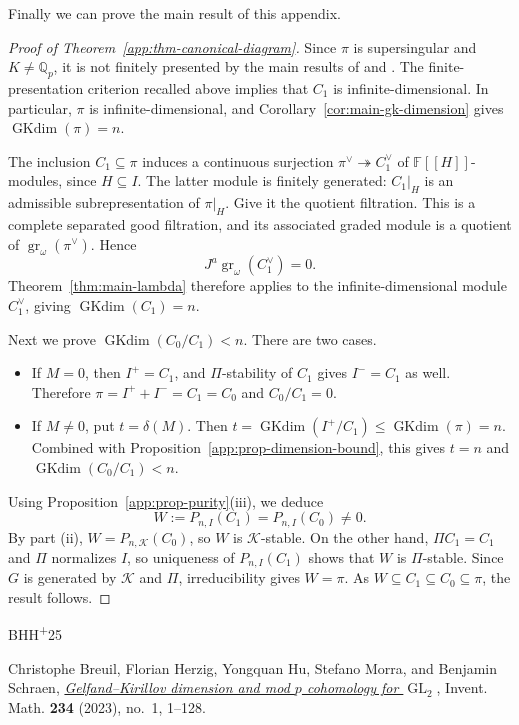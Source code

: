 \documentclass[11pt]{article}
\numberwithin{equation}{section}
\theoremstyle{definition}
\theoremstyle{remark}
\newcommand{\F}{\mathbb F}
\newcommand{\Q}{\mathbb Q}
\DeclareMathOperator{\GL}{GL}
\DeclareMathOperator{\gr}{gr}
\DeclareMathOperator{\GKdim}{GKdim}
\begin{document}
\begin{cbunit}
Finally we can prove the main result of this appendix.

\begin{proof}[Proof of Theorem~\ref{app:thm-canonical-diagram}]
Since $\pi$ is supersingular and $K\ne\Q_p$, it is not finitely
presented by the main results of \cite{Sch15} and \cite{Wu21}.
The finite-presentation criterion recalled above implies that
$C_1$ is infinite-dimensional. In particular, $\pi$ is
infinite-dimensional, and Corollary~\ref{cor:main-gk-dimension}
gives $\GKdim(\pi)=n$.

The inclusion $C_1\subseteq\pi$ induces a continuous surjection
$\pi^\vee\twoheadrightarrow C_1^\vee$ of $\F[[H]]$-modules,
since $H\subseteq I$. The latter module is finitely generated:
$C_1|_H$ is an admissible subrepresentation of $\pi|_H$.
Give it the quotient filtration. {This is a complete separated
good filtration, and its associated graded module is a quotient of
$\gr_\omega(\pi^\vee)$. } Hence
\[
 J^a\gr_\omega(C_1^\vee)=0.
\]
Theorem~\ref{thm:main-lambda} therefore applies to the
infinite-dimensional module $C_1^\vee$, giving
$\GKdim(C_1)=n$.

Next we prove $\GKdim(C_0/C_1)<n$. There are two cases.
\begin{itemize}
\item If $M=0$, then $I^+=C_1$, and $\Pi$-stability of
$C_1$ gives $I^-=C_1$ as well. Therefore
$\pi=I^++I^-=C_1=C_0$ and $C_0/C_1=0$.
\item If $M\ne0$, put $t=\delta(M)$. Then
$t=\GKdim(I^+/C_1)\leq\GKdim(\pi)=n$.
Combined with Proposition~\ref{app:prop-dimension-bound}, this
gives $t=n$ and $\GKdim(C_0/C_1)<n$.
\end{itemize}

Using Proposition~\ref{app:prop-purity}(iii), we deduce
\[
 W:=P_{n,I}(C_1)=P_{n,I}(C_0)\ne0.
\]
By part (ii), $W=P_{n,\mathcal K}(C_0)$, so $W$ is
$\mathcal K$-stable. On the other hand, $\Pi C_1=C_1$ and
$\Pi$ normalizes $I$, so uniqueness of $P_{n,I}(C_1)$ shows
that $W$ is $\Pi$-stable. Since $G$ is generated by
$\mathcal K$ and $\Pi$, irreducibility gives $W=\pi$.
As $W\subseteq C_1\subseteq C_0\subseteq\pi$, the result follows.
\end{proof}

\begin{thebibliography}{BHH\textsuperscript{+}25}
\small

Christophe Breuil, Florian Herzig, Yongquan Hu, Stefano Morra,
and Benjamin Schraen,
\href{https://doi.org/10.1007/s00222-023-01202-8}{\emph{Gelfand--Kirillov
dimension and mod $p$ cohomology for $\GL_2$}},
Invent. Math. \textbf{234} (2023), no.~1, 1--128.


\end{thebibliography}
\end{cbunit}
\end{document}
